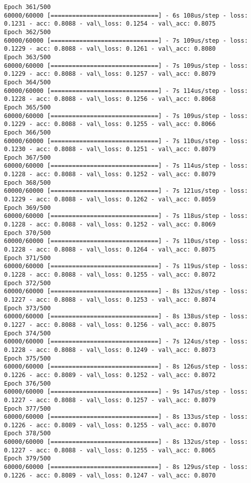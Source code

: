 \documentclass[11pt]{article}
\begin{document}
\begin{Verbatim}[commandchars=\\\{\}]
Epoch 361/500
60000/60000 [==============================] - 6s 108us/step - loss: 0.1231 - acc: 0.8088 - val\_loss: 0.1254 - val\_acc: 0.8075
Epoch 362/500
60000/60000 [==============================] - 7s 109us/step - loss: 0.1229 - acc: 0.8088 - val\_loss: 0.1261 - val\_acc: 0.8080
Epoch 363/500
60000/60000 [==============================] - 7s 109us/step - loss: 0.1229 - acc: 0.8088 - val\_loss: 0.1257 - val\_acc: 0.8079
Epoch 364/500
60000/60000 [==============================] - 7s 114us/step - loss: 0.1228 - acc: 0.8088 - val\_loss: 0.1256 - val\_acc: 0.8068
Epoch 365/500
60000/60000 [==============================] - 7s 109us/step - loss: 0.1229 - acc: 0.8088 - val\_loss: 0.1255 - val\_acc: 0.8066
Epoch 366/500
60000/60000 [==============================] - 7s 110us/step - loss: 0.1230 - acc: 0.8088 - val\_loss: 0.1251 - val\_acc: 0.8079
Epoch 367/500
60000/60000 [==============================] - 7s 114us/step - loss: 0.1228 - acc: 0.8088 - val\_loss: 0.1252 - val\_acc: 0.8079
Epoch 368/500
60000/60000 [==============================] - 7s 121us/step - loss: 0.1229 - acc: 0.8088 - val\_loss: 0.1262 - val\_acc: 0.8059
Epoch 369/500
60000/60000 [==============================] - 7s 118us/step - loss: 0.1228 - acc: 0.8088 - val\_loss: 0.1252 - val\_acc: 0.8069
Epoch 370/500
60000/60000 [==============================] - 7s 110us/step - loss: 0.1228 - acc: 0.8088 - val\_loss: 0.1264 - val\_acc: 0.8075
Epoch 371/500
60000/60000 [==============================] - 7s 119us/step - loss: 0.1228 - acc: 0.8088 - val\_loss: 0.1255 - val\_acc: 0.8072
Epoch 372/500
60000/60000 [==============================] - 8s 132us/step - loss: 0.1227 - acc: 0.8088 - val\_loss: 0.1253 - val\_acc: 0.8074
Epoch 373/500
60000/60000 [==============================] - 8s 138us/step - loss: 0.1227 - acc: 0.8088 - val\_loss: 0.1256 - val\_acc: 0.8075
Epoch 374/500
60000/60000 [==============================] - 7s 124us/step - loss: 0.1228 - acc: 0.8088 - val\_loss: 0.1249 - val\_acc: 0.8073
Epoch 375/500
60000/60000 [==============================] - 8s 126us/step - loss: 0.1226 - acc: 0.8089 - val\_loss: 0.1252 - val\_acc: 0.8072
Epoch 376/500
60000/60000 [==============================] - 9s 147us/step - loss: 0.1227 - acc: 0.8088 - val\_loss: 0.1257 - val\_acc: 0.8079
Epoch 377/500
60000/60000 [==============================] - 8s 133us/step - loss: 0.1226 - acc: 0.8089 - val\_loss: 0.1255 - val\_acc: 0.8070
Epoch 378/500
60000/60000 [==============================] - 8s 132us/step - loss: 0.1227 - acc: 0.8088 - val\_loss: 0.1255 - val\_acc: 0.8065
Epoch 379/500
60000/60000 [==============================] - 8s 129us/step - loss: 0.1226 - acc: 0.8089 - val\_loss: 0.1247 - val\_acc: 0.8070

\end{Verbatim}
\end{document}
